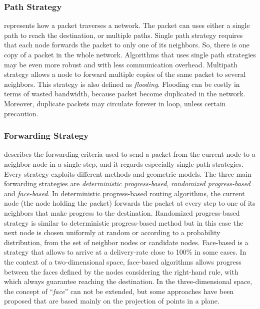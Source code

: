 \documentclass[journal,comsoc]{IEEEtran}
\begin{document}
\subsubsection{Path Strategy} represents how a packet traverses a network. The packet can uses either a single path to reach the destination, or multiple paths. 
Single path strategy requires that each node forwards the packet to only one of its neighbors. So, there is one copy of a packet in the whole network. Algorithms that uses single path strategies may be even more robust and with less communication overhead.
Multipath strategy allows a node to forward multiple copies of the same packet to several neighbors. This strategy is also defined as \textit{flooding}. Flooding can be costly in terms of wasted bandwidth, because packet become duplicated in the network. Moreover, duplicate packets may circulate forever in loop, unless certain precaution.
\subsubsection{Forwarding Strategy} describes the forwarding criteria used to send a packet from the current node to a neighbor node in a single step, and it regards especially single path strategies. Every strategy exploits different methods and geometric models. The three main forwarding strategies are \textit{deterministic progress-based}, \textit{randomized progress-based} and \textit{face-based}.
In deterministic progress-based routing algorithms, the current node (the node holding the packet) forwards the packet at every step to one of its neighbors that make progress to the destination.
Randomized progress-based strategy is similar to deterministic progress-based method but in this case the next node is chosen uniformly at random or according to a probability distribution, from the set of neighbor nodes or candidate nodes.
Face-based is a strategy that allows to arrive at a delivery-rate close to 100\% in some cases. In the context of a two-dimensional space, face-based algorithms allows progress between the faces defined by the nodes considering the right-hand rule, with which always guarantee reaching the destination. In the three-dimensional space, the concept of ``\emph{face}'' can not be extended, but some approaches have been proposed that are based mainly on the projection of points in a plane.
\end{document}
